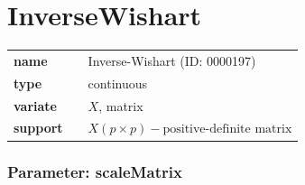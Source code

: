 %
%
%
\smallskip\section*{InverseWishart} 

  \bigskip 

\begin{tabular}{p{2cm}cl}
\textbf{name} & & Inverse-Wishart (ID: 0000197)\\ 
 
\textbf{type} & & continuous \\ 

\textbf{variate} & & $X$, matrix \\ 

\textbf{support} & & $X(p \times p) - \text{positive-definite matrix}$
\end{tabular}
\subsubsection*{Parameter: scaleMatrix}


